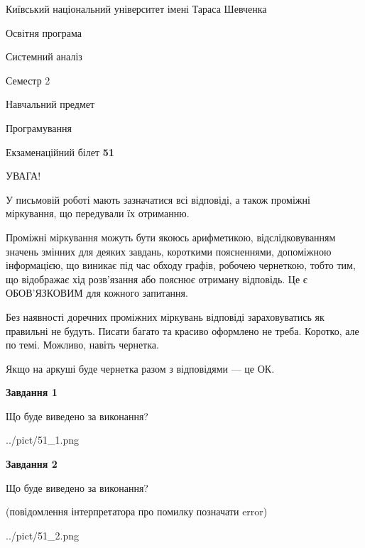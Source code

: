 \documentclass[12pt, ukrainian]{article}
\begin{document}
{{\begin {small}\par
{ \center  Київський національний університет імені Тараса Шевченка \par}
{\parbox {5 cm}{Освітня програма \hfill}{\parbox {7 cm}{Системний аналіз \hfill}}\parbox {6 cm}{\hfill Семестр 2}}\par
{\parbox {5 cm} {Навчальний предмет \hfill}\parbox {7 cm}{Програмування \hfill}\parbox {6cm}{\hfill}\par}\vspace{-7pt} \end{small}}{\center Екзаменаційний білет \No \textbf
{ 51 }\par}}
{
\begin {large}
УВАГА!

У письмовій роботі мають зазначатися всі відповіді, а також проміжні міркування, що передували їх отриманню.

Проміжні міркування можуть бути якоюсь арифметикою, відслідковуванням зна\-чень змінних для деяких завдань,
короткими поясненнями, допоміжною інформацією, що виникає під час обходу графів, робочею чернеткою,
тобто тим, що відображає хід розв’язання або пояснює отриману відповідь.
Це є ОБОВ’ЯЗКОВИМ для кожного запитання.

Без наявності доречних проміжних міркувань відповіді зараховуватись як правиль\-ні не будуть.
Писати багато та красиво оформлено не треба. Коротко, але по темі. Можли\-во, навіть чернетка.

Якщо на аркуші буде чернетка разом з відповідями --- це ОК.

\newpage

{\begin {center}\textbf{Завдання 1}\end {center}}\par
Що буде виведено за виконання?\par
\begin{center}
	{../pict/51_1.png}
\end{center}
\newpage

{\begin {center}\textbf{Завдання 2}\end {center}}\par
Що буде виведено за виконання?\par
 (повідомлення інтерпретатора про помилку позначати error)\par
\begin{center}
	{../pict/51_2.png}
\end{center}
\newpage


\end{large}}
\end{document}
